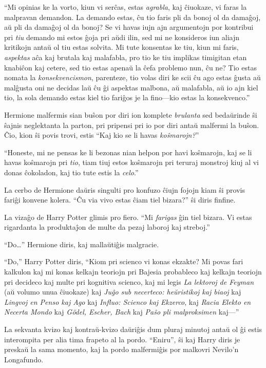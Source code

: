 ``Mi opinias ke la vorto, kiun vi serĉas, estas \emph{agrabla}, kaj
ĉiuokaze, vi faras la malpravan demandon. La demando estas, ĉu tio
faris pli da bonoj ol da damaĝoj, aŭ pli da damaĝoj ol da bonoj? Se vi
havas iujn ajn argumentojn por kontribui pri \emph{tiu} demando mi
estos ĝoja pri aŭdi ilin, sed mi ne konsideros iun aliajn kritikojn
antaŭ ol tiu estas solvita. Mi tute konsentas ke tiu, kiun mi faris,
\emph{aspektas} aĉa kaj brutala kaj malafabla, pro tio ke tiu implikas
timigitan etan knabiĉon kaj cetere, sed tio estas apenaŭ la ĉefa
problemo nun, ĉu ne? Tio estas nomata la \emph{konsekvencismon},
parenteze, tio volas diri ke scii ĉu ago estas ĝusta aŭ malĝusta oni
ne decidas laŭ ĉu ĝi aspektas malbona, aŭ malafabla, aŭ io ajn kiel
tio, la sola demando estas kiel tio fariĝos je la fino—kio estas la
konsekvenco.''

Hermione malfermis sian buŝon por diri ion komplete \emph{brulanta}
sed bedaŭrinde ŝi ŝajnis neglektanta la parton, pri pripensi pri io
por diri antaŭ malfermi la buŝon. Ĉio, kion ŝi povis trovi, estis
``Kaj kio se li havas \emph{koŝmarojn?}''

``Honeste, mi ne pensas ke li bezonas nian helpon por havi koŝmarojn,
kaj se li havas koŝmarojn pri \emph{tio}, tiam tiuj estos koŝmarojn
pri teruraj monstroj kiuj al vi donas ĉokoladon, kaj tio tute estis la
\emph{celo}.''

La cerbo de Hermione daŭris singulti pro konfuzo ĉiujn fojojn kiam ŝi
provis fariĝi konvene kolera. ``Ĉu via vivo estas ĉiam tiel bizara?''
ŝi diris finfine.

La vizaĝo de Harry Potter glimis pro fiero. ``Mi \emph{farigas} ĝin
tiel bizara. Vi estas rigardanta la produktaĵon de multe da pezaj
laboroj kaj streboj.''

``Do\ldots'' Hermione diris, kaj mallaŭtiĝis malgracie.

``Do,'' Harry Potter diris, ``Kiom pri scienco vi konas ekzakte? Mi
povas fari kalkulon kaj mi konas kelkajn teoriojn pri Bajesia
probableco kaj kelkajn teoriojn pri decideco kaj multe pri kognitiva
scienco, kaj mi legis \emph{La lektoroj de Feyman} (aŭ volumo unua
ĉiuokaze) kaj \emph{Juĝo sub necerteco: heŭristikoj kaj biaoj} kaj
\emph{Lingvoj en Penso kaj Ago} kaj \emph{Influo: Scienco kaj
  Ekzerco}, kaj \emph{Racia Elekto en Necerta Mondo} kaj \emph{Gödel,
  Escher, Bach} kaj \emph{Paŝo pli malproksimen} kaj—''

La sekvanta kvizo kaj kontraŭ-kvizo daŭriĝis dum pluraj minutoj antaŭ
ol ĝi estis interompita per alia tima frapeto al la pordo. ``Eniru'',
ŝi kaj Harry diris je preskaŭ la sama momento, kaj la pordo
malfermiĝis por malkovri Nevilo'n Longafundo.

